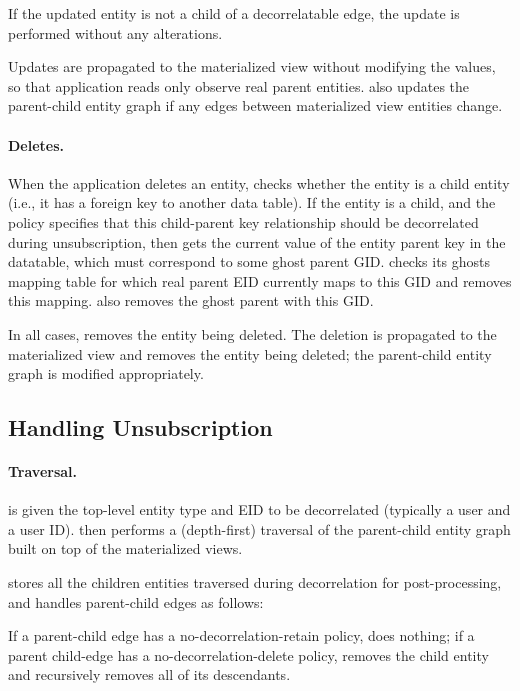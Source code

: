 If the updated entity is not a child of a decorrelatable edge, the update is performed without any
alterations.

Updates are propagated to the materialized view without modifying the values, so that application
reads only observe real parent entities.
\name also updates the parent-child entity graph if any edges between materialized view entities change.

\paragraph{Deletes.}
When the application deletes an entity, \name checks whether
the entity is a child entity (i.e., it has a foreign key to another data table). 
If the entity is a child, and the policy specifies that this child-parent key
relationship should be decorrelated during unsubscription, then \name gets the current value of the
entity parent key in the datatable, which must correspond to some ghost parent GID.
\name checks its ghosts mapping table for which real parent EID currently maps to this GID and removes
this mapping. \name also removes the ghost parent with this GID.

In all cases, \name removes the entity being deleted.
The deletion is propagated to the materialized view and removes the entity being deleted; the
parent-child entity graph is modified appropriately.

\subsection{Handling Unsubscription}
\paragraph{Traversal.}
\name is given the top-level entity type and EID to be decorrelated (typically a user and a user ID).
\name then performs a (depth-first) traversal of the parent-child entity graph built on top of the materialized
views. 

\name stores all the children entities traversed during decorrelation for post-processing, and
handles parent-child edges as follows:

If a parent-child edge has a no-decorrelation-retain policy, \name does nothing; if a parent child-edge has a
no-decorrelation-delete policy, \name removes the child entity and recursively removes all of its
descendants. 

